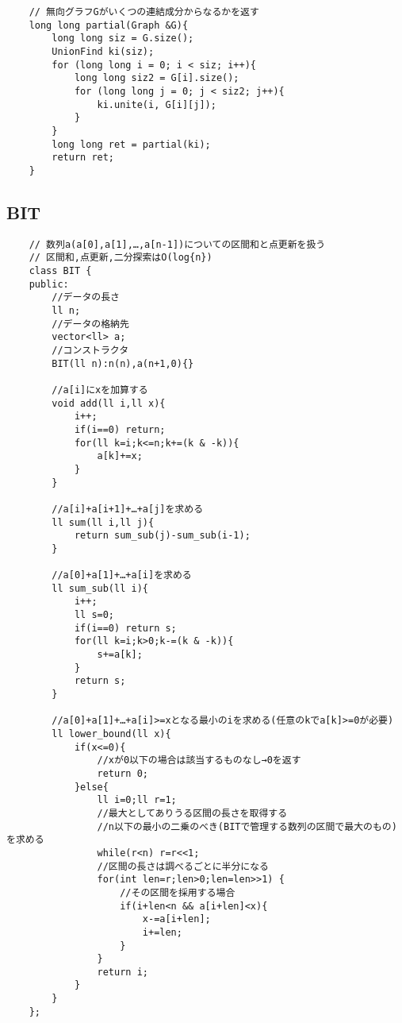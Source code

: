 \documentclass[a4paper, landscape, 9pt]{jarticle} %
\begin{document}
\begin{multicols*}{3}
\begin{lstlisting}
    // 無向グラフGがいくつの連結成分からなるかを返す
    long long partial(Graph &G){
        long long siz = G.size();
        UnionFind ki(siz);
        for (long long i = 0; i < siz; i++){
            long long siz2 = G[i].size();
            for (long long j = 0; j < siz2; j++){
                ki.unite(i, G[i][j]);
            }
        }
        long long ret = partial(ki);
        return ret;
    }
    \end{lstlisting}

    \subsection{BIT}
    \begin{lstlisting}
    // 数列a(a[0],a[1],…,a[n-1])についての区間和と点更新を扱う
    // 区間和,点更新,二分探索はO(log{n})
    class BIT {
    public:
        //データの長さ
        ll n;
        //データの格納先
        vector<ll> a;
        //コンストラクタ
        BIT(ll n):n(n),a(n+1,0){}
    
        //a[i]にxを加算する
        void add(ll i,ll x){
            i++;
            if(i==0) return;
            for(ll k=i;k<=n;k+=(k & -k)){
                a[k]+=x;
            }
        }
    
        //a[i]+a[i+1]+…+a[j]を求める
        ll sum(ll i,ll j){
            return sum_sub(j)-sum_sub(i-1);
        }
    
        //a[0]+a[1]+…+a[i]を求める
        ll sum_sub(ll i){
            i++;
            ll s=0;
            if(i==0) return s;
            for(ll k=i;k>0;k-=(k & -k)){
                s+=a[k];
            }
            return s;
        }
    
        //a[0]+a[1]+…+a[i]>=xとなる最小のiを求める(任意のkでa[k]>=0が必要)
        ll lower_bound(ll x){
            if(x<=0){
                //xが0以下の場合は該当するものなし→0を返す
                return 0;
            }else{
                ll i=0;ll r=1;
                //最大としてありうる区間の長さを取得する
                //n以下の最小の二乗のべき(BITで管理する数列の区間で最大のもの)を求める
                while(r<n) r=r<<1;
                //区間の長さは調べるごとに半分になる
                for(int len=r;len>0;len=len>>1) {
                    //その区間を採用する場合
                    if(i+len<n && a[i+len]<x){
                        x-=a[i+len];
                        i+=len;
                    }
                }
                return i;
            }
        }
    };
    \end{lstlisting}

\end{multicols*}
\end{document}

